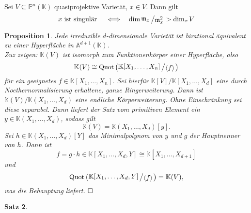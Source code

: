 \documentclass[11pt]{book}
\newtheorem{theorem}{Satz}[section]
\newtheorem{prop}[theorem]{Proposition}
\theoremstyle{nonumberbreak}
\newenvironment{pr}[1][]{\ifthenelse{\equal{#1}{}}{\proof}{\proof[#1]}\rm}{\endproof}
\newenvironment{folg}[1][]{\ifthenelse{\equal{#1}{}}{\folger}{\folger[#1]}\rm}{\endfolger}
\newcommand{\slant}[2]{{\raisebox{.1em}{$#1$}\left/\raisebox{-.1em}{$#2$}\right.}}
\begin{document}
\begin{spacing}{1.3}
\begin{folg} %

Sei $V \subseteq \mathbb{P}^n(\mathbb{K})$ quasiprojektive Varietät, $x \in V$. Dann gilt
$$x \textrm{ ist singulär } \quad \Longleftrightarrow \quad \dim \slant{\mathfrak{m}_x}{\mathfrak{m}_x^2} > \dim_x V$$
\end{folg}


\begin{prop} %
Jede irreduzible $d$-dimensionale Varietät ist birational äquivalent zu einer Hyperfläche in $\mathbb{A}^{d+1}(\mathbb{K})$. \\
\begin{pr}
Zuz zeigen: $\mathbb{K}(V)$ ist isomorph zum Funktionenkörper einer Hyperfläche, also
$$\mathbb{K}(V) \cong \textrm{Quot}\left(\slant{\mathbb{K}[X_1, \ldots, X_n]}{\langle f \rangle } \right)$$
für ein geeignetes $f \in \mathbb{K}[X_1, \ldots, X_n]$. Sei hierfür $\mathbb{K}[V] / \mathbb{K}[X_1, \ldots, X_d]$ eine durch Noethernormalisierung erhaltene, ganze Ringerweiterung. Dann ist $\mathbb{K}(V) / \mathbb{K}(X_1, \ldots, X_d)$ eine endliche Körperweiterung. Ohne Einschränkung sei diese separabel. Dann liefert der Satz vom primitiven Element ein $y \in \mathbb{K}(X_1, \ldots, X_d)$, sodass gilt
$$\mathbb{K}(V) = \mathbb{K}(X_1, \ldots, X_d) [y].$$
Sei $h \in \mathbb{K}(X_1, \ldots, X_d)[Y]$ das Minimalpolynom von $y$ und $g$ der Hauptnenner von $h$. Dann ist 
$$f=g \cdot h \in \mathbb{K}[X_1, \ldots, X_d, Y] \cong \mathbb{K}[X_1, \ldots, X_{d+1}]$$
und
$$\textrm{Quot}\left( \slant{\mathbb{K}[X_1, \ldots, X_d, Y]}{\langle f \rangle} \right) = \mathbb{K}(V),$$
was die Behauptung liefert. $\hfill \Box$
\end{pr}
\end{prop}

\begin{theorem} %


\end{theorem}
\end{spacing}
\end{document}
